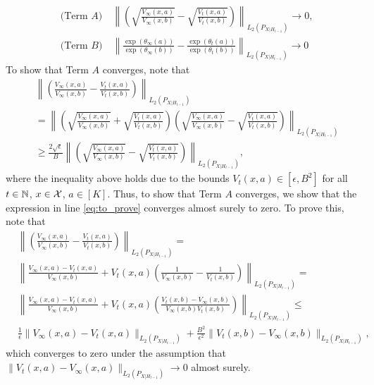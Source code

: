 \documentclass{article}
\begin{document}
\begin{appendices}
\begin{align}
     &\text{(Term }A)\quad \left\| \left(\sqrt{\frac{V_\infty(x,a)}{V_\infty(x,b)}}  - \sqrt{\frac{V_t(x,a)}{V_t(x,b)}}\right) \right\|_{L_2(P_{X|H_{t-1}})} \rightarrow 0, \\
      &\text{(Term }B) \quad \left\|\frac{\exp(\theta_\infty(a))}{\exp(\theta_\infty(b))} - \frac{\exp(\theta_t(a))}{\exp(\theta_t(b))}  \right\|_{L_2(P_{X|H_{t-1}})} \rightarrow 0
\end{align}
To show that Term $A$ converges, note that 
\begin{align}
    &\left\| \left({\frac{V_\infty(x,a)}{V_\infty(x,b)}}  - {\frac{V_t(x,a)}{V_t(x,b)}}\right) \right\|_{L_2(P_{X|H_{t-1}})}\label{eq:to_prove}\\
    &= \left\| \left(\sqrt{\frac{V_\infty(x,a)}{V_\infty(x,b)}}  + \sqrt{\frac{V_t(x,a)}{V_t(x,b)}}\right)\left(\sqrt{\frac{V_\infty(x,a)}{V_\infty(x,b)}}  - \sqrt{\frac{V_t(x,a)}{V_t(x,b)}}\right) \right\|_{L_2(P_{X|H_{t-1}})}\\
    &\geq \frac{2\sqrt{\epsilon}}{B}\left\| \left(\sqrt{\frac{V_\infty(x,a)}{V_\infty(x,b)}}  - \sqrt{\frac{V_t(x,a)}{V_t(x,b)}}\right)\right\|_{L_2(P_{X|H_{t-1}})},
\end{align}
where the inequality above holds due to the bounds $V_t(x,a) \in [\epsilon, B^2]$ for all $t \in \mathbb{N}$, $x \in \mathcal{X}$, $a \in [K]$. Thus, to show that Term $A$ converges, we show that the expression in line \eqref{eq:to_prove} converges almost surely to zero. To prove this, note that  
\begin{align}
    &\left\|\left({\frac{V_\infty(x,a)}{V_\infty(x,b)}}  - {\frac{V_t(x,a)}{V_t(x,b)}}\right) \right\|_{L_2(P_{X|H_{t-1}})} = \\
    &\left\|{\frac{V_\infty(x,a) - V_t(x,a)}{V_\infty(x,b)}}  + V_t(x,a)\left({\frac{1}{V_\infty(x,b)}-\frac{1}{V_t(x,b)}}\right) \right\|_{L_2(P_{X|H_{t-1}})}=\\ 
    &  \left\|{\frac{V_\infty(x,a) - V_t(x,a)}{V_\infty(x,b)}}  + V_t(x,a)\left({\frac{V_t(x,b) - V_\infty(x,b)}{V_\infty(x,b)V_t(x,b)}}\right) \right\|_{L_2(P_{X|H_{t-1}})}\leq \\
    & \frac{1}{\epsilon} \|V_\infty(x,a) - V_t(x,a) \|_{L_2(P_{X|H_{t-1}})} + \frac{B^2}{\epsilon^2} \| V_t(x,b) - V_\infty(x,b)\|_{L_2(P_{X|H_{t-1}})},
\end{align}
which converges to zero under the assumption that $\|V_t(x,a) - V_\infty(x,a) \|_{L_2(P_{X|H_{t-1}})} \rightarrow 0$ almost surely. 


\end{appendices}
\end{document}

